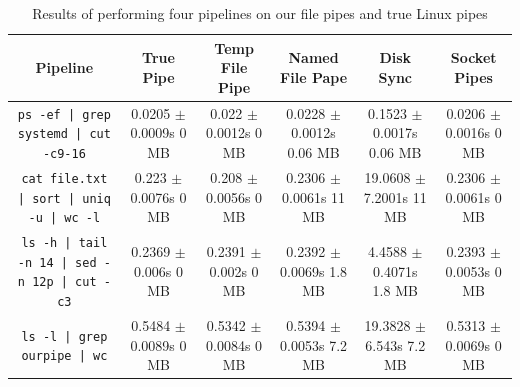 \begin{table}[!htp]
\centering
\begin{footnotesize}
\begin{tabular}{cccccc}
\toprule
    Pipeline & True Pipe & Temp File Pipe & Named File Pape &  Disk Sync & Socket Pipes \\ \midrule
    \texttt{ps -ef | grep systemd | cut -c9-16} & \makecell{0.0205 $\pm$ 0.0009s \\ 0 MB} & \makecell{0.022 $\pm$ 0.0012s \\ 0 MB} & \makecell{0.0228 $\pm$ 0.0012s \\ 0.06 MB} & \makecell{0.1523 $\pm$ 0.0017s \\ 0.06 MB} & \makecell{0.0206 $\pm$ 0.0016s \\ 0 MB}  \\
    
    \texttt{cat file.txt | sort | uniq -u | wc -l} & \makecell{0.223 $\pm$ 0.0076s \\ 0 MB} & \makecell{0.208 $\pm$ 0.0056s \\ 0 MB} & \makecell{0.2306 $\pm$ 0.0061s \\ 11 MB} & \makecell{19.0608 $\pm$ 7.2001s \\ 11 MB} & \makecell{0.2306 $\pm$ 0.0061s \\ 0 MB}  \\
    
    \texttt{ls -h |  tail -n 14 | sed -n 12p | cut -c3} & \makecell{0.2369 $\pm$ 0.006s \\ 0 MB} & \makecell{0.2391 $\pm$ 0.002s \\ 0 MB} & \makecell{0.2392 $\pm$ 0.0069s \\ 1.8 MB} & \makecell{4.4588 $\pm$ 0.4071s \\ 1.8 MB} & \makecell{0.2393 $\pm$ 0.0053s \\ 0 MB}  \\
    
    \texttt{ls -l | grep ourpipe | wc} & \makecell{0.5484 $\pm$ 0.0089s \\ 0 MB} & \makecell{0.5342 $\pm$ 0.0084s \\ 0 MB} & \makecell{0.5394 $\pm$ 0.0053s \\ 7.2 MB} & \makecell{19.3828 $\pm$ 6.543s \\ 7.2 MB} & \makecell{0.5313 $\pm$ 0.0069s \\ 0 MB} \\
    \bottomrule
\end{tabular}
\end{footnotesize}
\caption{\small Results of performing four pipelines on our file pipes and true Linux pipes} 
\vspace{-0.3cm}
\label{table1}
\end{table}

